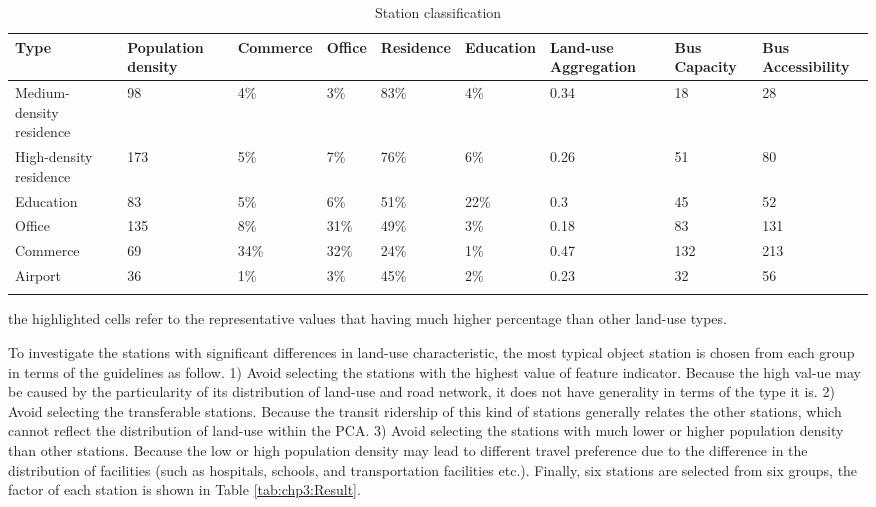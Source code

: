\begin{sidewaystable}[htbp]
	\centering
	\caption{Station classification}
	\label{tab:chp3:StationClassification}
	\small
	\renewcommand{\arraystretch}{1.25} %
	\begin{tabular}{p{12em}<{\centering}p{4em}<{\centering}p{4em}<{\centering}p{4em}<{\centering}p{4em}<{\centering}p{4em}<{\centering}p{5em}<{\centering}p{5em}<{\centering}p{5em}<{\centering}}
		
		\Xhline{1.5pt}
		Type & Population density & Commerce & Office & Residence & Education & Land-use Aggregation & Bus Capacity & Bus Accessibility \\
		\midrule
		
		Medium-density residence & 98 & 4\% & 3\% & \cellcolor[rgb]{.8, .8, .8} 83\% & 4\% & 0.34 & 18 & 28 \\
		High-density residence & 173 & 5\% & 7\% & \cellcolor[rgb]{.8, .8, .8} 76\% & 6\% & 0.26 & 51 & 80 \\
		Education & 83 & 5\% & 6\% & 51\% & \cellcolor[rgb]{.8, .8, .8} 22\% & 0.3 & 45 & 52 \\
		Office & 135 & 8\% & \cellcolor[rgb]{.8, .8, .8} 31\% & 49\% & 3\% & 0.18 & 83 & 131 \\
		Commerce & 69 & \cellcolor[rgb]{.8, .8, .8} 34\% & \cellcolor[rgb]{.8, .8, .8} 32\% & 24\% & 1\% & 0.47 & 132 & 213 \\
		Airport & 36 & 1\% & 3\% & 45\% & 2\% & 0.23 & 32 & 56 \\
		\Xhline{1.5pt}
		
	\end{tabular}
	\begin{description}
		\label{note:tab:chp3:StationClassification}
		\item[Note:] the highlighted cells refer to the representative values that having much higher percentage than other land-use types.
	\end{description}
	
\end{sidewaystable}

%
To investigate the stations with significant differences in land-use characteristic, the most typical object station is chosen from each group in terms of the guidelines as follow. 1) Avoid selecting the stations with the highest value of feature indicator. Because the high val-ue may be caused by the particularity of its distribution of land-use and road network, it does not have generality in terms of the type it is. 2) Avoid selecting the transferable stations. Because the transit ridership of this kind of stations generally relates the other stations, which cannot reflect the distribution of land-use within the PCA. 3) Avoid selecting the stations with much lower or higher population density than other stations. Because the low or high population density may lead to different travel preference due to the difference in the distribution of facilities (such as hospitals, schools, and transportation facilities etc.). Finally, six stations are selected from six groups, the factor of each station is shown in Table \ref{tab:chp3:Result}.

